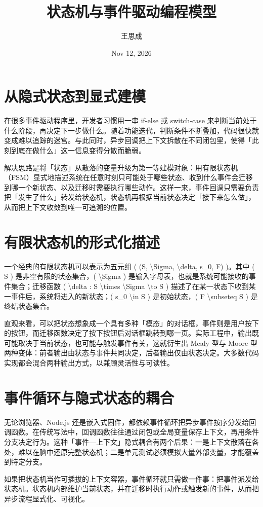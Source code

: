 \title{状态机与事件驱动编程模型}
\author{王思成}
\date{Nov 12, 2026}
\maketitle
\chapter{从隐式状态到显式建模}
在很多事件驱动程序里，开发者习惯用一串 if-else 或 switch-case 来判断当前处于什么阶段，再决定下一步做什么。随着功能迭代，判断条件不断叠加，代码很快就变成难以追踪的迷宫。与此同时，异步回调把上下文拆散在不同闭包里，使得「此刻到底在做什么」这一信息变得分散而脆弱。\par
解决思路是将「状态」从散落的变量升级为第一等建模对象：用有限状态机（FSM）显式地描述系统在任意时刻只可能处于哪些状态、收到什么事件会迁移到哪一个新状态、以及迁移时需要执行哪些动作。这样一来，事件回调只需要负责把「发生了什么」转发给状态机，状态机再根据当前状态决定「接下来怎么做」，从而把上下文收敛到唯一可追溯的位置。\par
\chapter{有限状态机的形式化描述}
一个经典的有限状态机可以表示为五元组 ( (S, \textbackslash{}Sigma, \textbackslash{}delta, s\_{}0, F) )。其中 ( S ) 是非空有限的状态集合，( \textbackslash{}Sigma ) 是输入字母表，也就是系统可能接收的事件集合；迁移函数 ( \textbackslash{}delta : S \textbackslash{}times \textbackslash{}Sigma \textbackslash{}to S ) 描述了在某一状态下收到某一事件后，系统将进入的新状态；( s\_{}0 \textbackslash{}in S ) 是初始状态，( F \textbackslash{}subseteq S ) 是终结状态集合。\par
直观来看，可以把状态想象成一个具有多种「模态」的对话框，事件则是用户按下的按钮，而迁移函数决定了按下按钮后对话框跳转到哪一页。实际工程中，输出既可能取决于当前状态，也可能与触发事件有关，这就衍生出 Mealy 型与 Moore 型两种变体：前者输出由状态与事件共同决定，后者输出仅由状态决定。大多数代码实现都会混合两种输出方式，以兼顾灵活性与可读性。\par
\chapter{事件循环与隐式状态的耦合}
无论浏览器、Node.js 还是嵌入式固件，都依赖事件循环把异步事件按序分发给回调函数。在传统写法中，回调函数往往通过闭包或全局变量保存上下文，再用条件分支决定行为。这种「事件—上下文」隐式耦合有两个后果：一是上下文散落在各处，难以在脑中还原完整状态机；二是单元测试必须模拟大量外部变量，才能覆盖到特定分支。\par
如果把状态机当作可插拔的上下文容器，事件循环就只需做一件事：把事件派发给状态机。状态机内部维护当前状态，并在迁移时执行动作或触发新的事件，从而把异步流程显式化、可视化。\par
